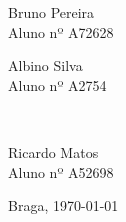 \begin{titlepage}
\begin{center}
\begin{minipage}{0.4\textwidth}
\begin{flushleft} \large
Bruno Pereira\\
Aluno nº A72628 
\end{flushleft}
\end{minipage}
\begin{minipage}{0.4\textwidth}
\begin{flushright} \large
Albino Silva\\
Aluno nº A2754
\end{flushright}
\end{minipage}\\[0.5cm]
\begin{minipage}{0.4\textwidth}
\begin{center} \large
Ricardo Matos\\
Aluno nº A52698
\end{center}
\end{minipage}




\vfill

\large Braga, {\large \today}

\end{center}
\end{titlepage}

